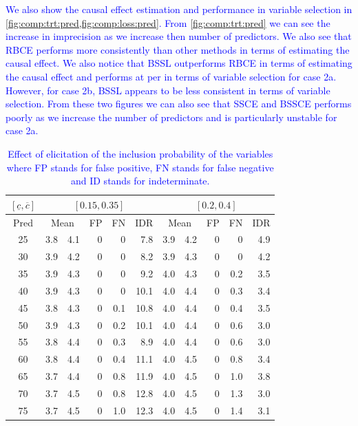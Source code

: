 \documentclass[preprint,12pt]{elsarticle}
\newcommand{\added}[1]{\textcolor{blue}{#1}}
\begin{document}
\added{We also show the causal effect estimation and performance in variable selection in \cref{fig:comp:trt:pred,fig:comp:loss:pred}. From \cref{fig:comp:trt:pred} we can see the increase in imprecision as we increase then number of predictors. We also see that RBCE performs more consistently than other methods in terms of estimating the causal effect. We also notice that BSSL outperforms RBCE in terms of estimating the causal effect and performs at per in terms of variable selection for case 2a. However, for case 2b, BSSL appears to be less consistent in terms of variable selection. From these two figures we can also see that SSCE and BSSCE performs poorly as we increase the number of predictors and is particularly unstable for case 2a.}



\begin{table}[h]
	\caption{\added{Effect of elicitation of the inclusion probability of the variables where FP stands for false positive, FN stands for false negative and ID stands for indeterminate. }}
	\label{tab:comp:elict}\centering
	\begin{tabular}{c|rrrrr|rrrrr}
		\hline
		\multicolumn{1}{c|}{$[\underline{c},\overline{c}]$}&
		\multicolumn{5}{c|}{$[0.15,0.35]$}&
		\multicolumn{5}{c}{$[0.2,0.4]$}\\
		\hline
		\multicolumn{1}{c|}{Pred}&
		\multicolumn{2}{c}{Mean} &
		\multicolumn{1}{c}{FP} &
		\multicolumn{1}{c}{FN} &
		\multicolumn{1}{c|}{IDR} &
		\multicolumn{2}{c}{Mean} &
		\multicolumn{1}{c}{FP} &
		\multicolumn{1}{c}{FN} &
		\multicolumn{1}{c}{IDR}\\
		\hline
		25 & 3.8 & 4.1 & 0 & 0 & 7.8 & 3.9 & 4.2 & 0 & 0 & 4.9 \\ 
		30 & 3.9 & 4.2 & 0 & 0 & 8.2 & 3.9 & 4.3 & 0 & 0 & 4.2 \\ 
		35 & 3.9 & 4.3 & 0 & 0 & 9.2 & 4.0 & 4.3 & 0 & 0.2 & 3.5 \\ 
		40 & 3.9 & 4.3 & 0 & 0 & 10.1 & 4.0 & 4.4 & 0 & 0.3 & 3.4 \\ 
		45 & 3.8 & 4.3 & 0 & 0.1 & 10.8 & 4.0 & 4.4 & 0 & 0.4 & 3.5 \\ 
		50 & 3.9 & 4.3 & 0 & 0.2 & 10.1 & 4.0 & 4.4 & 0 & 0.6 & 3.0 \\ 
		55 & 3.8 & 4.4 & 0 & 0.3 & 8.9 & 4.0 & 4.4 & 0 & 0.6 & 3.0 \\ 
		60 & 3.8 & 4.4 & 0 & 0.4 & 11.1 & 4.0 & 4.5 & 0 & 0.8 & 3.4 \\ 
		65 & 3.7 & 4.4 & 0 & 0.8 & 11.9 & 4.0 & 4.5 & 0 & 1.0 & 3.8 \\ 
		70 & 3.7 & 4.5 & 0 & 0.8 & 12.8 & 4.0 & 4.5 & 0 & 1.3 & 3.0 \\ 
		75 & 3.7 & 4.5 & 0 & 1.0 & 12.3 & 4.0 & 4.5 & 0 & 1.4 & 3.1 \\ 
		\hline
	\end{tabular}
\end{table}
\end{document}
